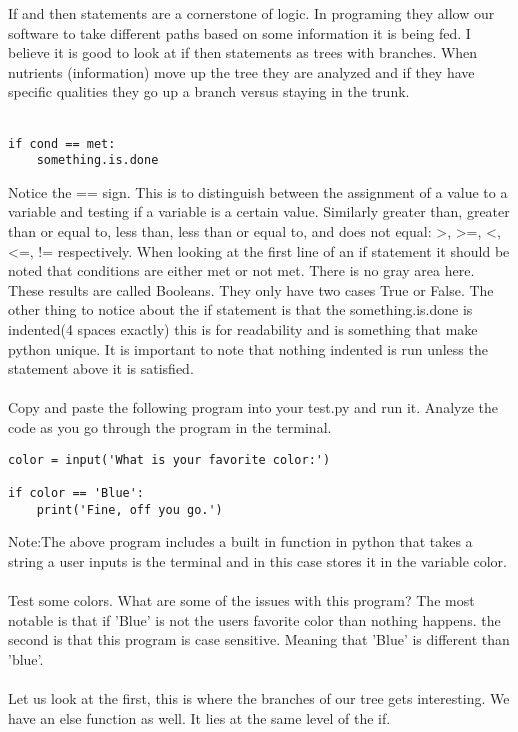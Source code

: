 \documentclass[../main.tex]{subfiles}
\begin{document}
If and then statements are a cornerstone of logic. In programing they allow our software to take different paths based on some information it is being fed. I believe it is good to look at if then statements as trees with branches. When nutrients (information) move up the tree they are analyzed and if they have specific qualities they go up a branch versus staying in the trunk.\\
\\
\begin{verbatim}
if cond == met:
    something.is.done
\end{verbatim}
Notice the == sign. This is to distinguish between the assignment of a value to a variable and testing if a variable is a certain value. Similarly greater than, greater than or equal to, less than, less than or equal to, and does not equal:  >, >=, <, <=, != respectively.  When looking at the first line of an if statement it should be noted that conditions are either met or not met. There is no gray area here. These results are called Booleans. They only have two cases True or False. The other thing to notice about the if statement is that the something.is.done is indented(4 spaces exactly) this is for readability and is something that make python unique. It is important to note that nothing indented is run unless the statement above it is satisfied.\\
\\
Copy and paste the following program into your test.py and run  it. Analyze the code as you go through the program in the terminal.\\
\begin{lstlisting}
color = input('What is your favorite color:')

if color == 'Blue':
    print('Fine, off you go.')
\end{lstlisting}
Note:The above program includes a built in function in python that takes a string a user inputs is the terminal and in this case stores it in the variable color.\\
\\
Test some colors. What are some of the issues with this program? The most notable is that if 'Blue' is not the users favorite color than nothing happens. the second is that this program is case sensitive. Meaning that 'Blue' is different than 'blue'.\\
\\
Let us look at the first, this is where the branches of our tree gets interesting. We have an else function as well. It lies at the same level of the if.\\
\end{document}
